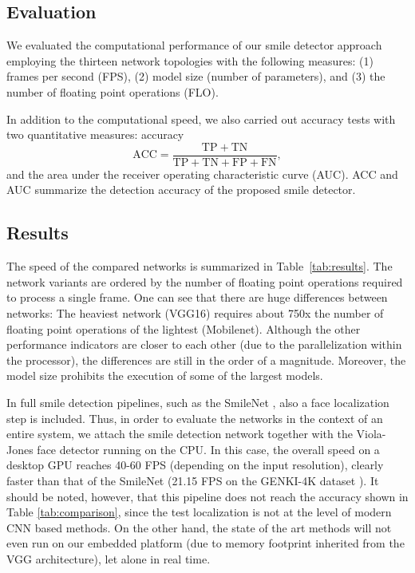 \documentclass[conference]{IEEEtran}
\begin{document}
\subsection{Evaluation}

We evaluated the computational performance of our smile detector approach employing the thirteen network topologies with the following measures: (1) frames per second (FPS), (2) model size (number of parameters), and (3) the number of floating point operations (FLO).

In addition to the computational speed, we also carried out  accuracy tests with  two quantitative measures: accuracy
\[
\mathrm{ACC} = \frac{\mathrm{TP} + \mathrm{TN}}{\mathrm{TP} + \mathrm{TN} + \mathrm{FP} + \mathrm{FN}},
\]
and the area under the receiver operating characteristic curve (AUC). ACC and AUC summarize the detection accuracy of the proposed smile detector.%




\subsection{Results}

The speed of the compared networks is summarized in Table~\ref{tab:results}. The network variants are ordered by the number of floating point operations required to process a single frame. One can see that there are huge differences between networks: The heaviest network (VGG16) requires about 750x the number of floating point operations of the lightest (Mobilenet). Although the other performance indicators are closer to each other (due to the parallelization within the processor), the differences are still in the order of a magnitude. Moreover, the model size prohibits the execution of some of the largest models.


In full smile detection pipelines, such as the SmileNet \cite{smilenet}, also a face localization step is included. Thus, in order to evaluate the networks in the context of an entire system, we attach the smile detection network together with the Viola-Jones face detector running on the CPU. In this case, the overall speed on a desktop GPU reaches 40-60 FPS (depending on the input resolution), clearly faster than that of the SmileNet (21.15 FPS on the GENKI-4K dataset \cite{smilenet}). It should be noted, however, that this pipeline does not reach the accuracy shown in Table \ref{tab:comparison}, since the test localization is not at the level of modern CNN based methods. On the other hand, the state of the art methods will not even run on our embedded platform (due to memory footprint inherited from the VGG architecture), let alone in real time.
\end{document}
